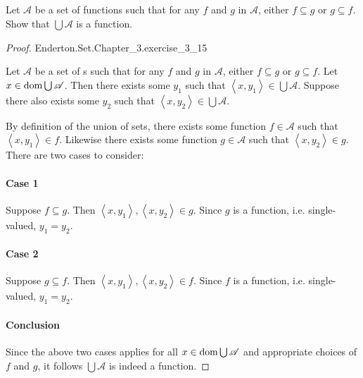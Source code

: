 \documentclass{report}
\begin{document}
\subsection{}%
\label{sub:exercise-3.15}

Let $\mathscr{A}$ be a set of functions such that for any $f$ and $g$ in
  $\mathscr{A}$, either $f \subseteq g$ or $g \subseteq f$.
Show that $\bigcup{\mathscr{A}}$ is a function.

\begin{proof}

    {Enderton.Set.Chapter\_3.exercise\_3\_15}

  Let $\mathscr{A}$ be a set of s such that for any $f$
    and $g$ in $\mathscr{A}$, either $f \subseteq g$ or $g \subseteq f$.
  Let $x \in \mathop{\text{dom}}{\bigcup{\mathscr{A}}}$.
  Then there exists some $y_1$ such that
    $\left< x, y_1 \right> \in \bigcup{\mathscr{A}}$.
  Suppose there also exists some $y_2$ such that
    $\left< x, y_2 \right> \in \bigcup{\mathscr{A}}$.

  By definition of the union of sets, there exists some function
    $f \in \mathscr{A}$ such that $\left< x, y_1 \right> \in f$.
  Likewise there exists some function $g \in \mathscr{A}$ such that
    $\left< x, y_2 \right> \in g$.
  There are two cases to consider:

  \paragraph{Case 1}%

    Suppose $f \subseteq g$.
    Then $\left< x, y_1 \right>, \left< x, y_2 \right> \in g$.
    Since $g$ is a function, i.e. single-valued, $y_1 = y_2$.

  \paragraph{Case 2}%

    Suppose $g \subseteq f$.
    Then $\left< x, y_1 \right>, \left< x, y_2 \right> \in f$.
    Since $f$ is a function, i.e. single-valued, $y_1 = y_2$.

  \paragraph{Conclusion}%

    Since the above two cases applies for all
      $x \in \mathop{\text{dom}}{\bigcup{\mathscr{A}}}$ and appropriate choices of $f$ and $g$,
      it follows $\bigcup{\mathscr{A}}$ is indeed a function.

\end{proof}
\end{document}
